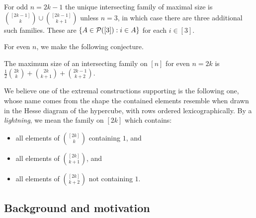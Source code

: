 \begin{theorem}\label{th:intersecting-class}
For odd $n=2k-1$ the unique intersecting \saw family of maximal size is $\binom{[2k-1]}{k}\cup\binom{[2k-1]}{k+1}$ unless $n=3$, in which case there are three additional such families. These are $\{ A \in \mathcal{P}([3]) : i\in A\}$ for each $i\in [3]$. 
\end{theorem}

For even $n$, we make the following conjecture.

\begin{conjecture} \label{conj:intersecting-even}
The maximum size of an intersecting \saw family on $[n]$ for even $n=2k$ is $\frac{1}{2}\binom{2k}{k}+\binom{2k}{k+1}+\binom{2k-1}{k+2}$.
\end{conjecture}

We believe one of the extremal constructions supporting  is the following one, whose name comes from the shape the contained elements resemble when drawn in the Hesse diagram of the hypercube, with rows ordered lexicographically. By a \textit{lightning}, we mean the family on $[2k]$ which contains:
\begin{itemize}
\item all elements of $\binom{[2k]}{k}$ containing $1$, and
\item all elements of $\binom{[2k]}{k+1}$, and
\item all elements of $\binom{[2k]}{k+2}$ not containing $1$.
\end{itemize}

\subsection{Background and motivation}
